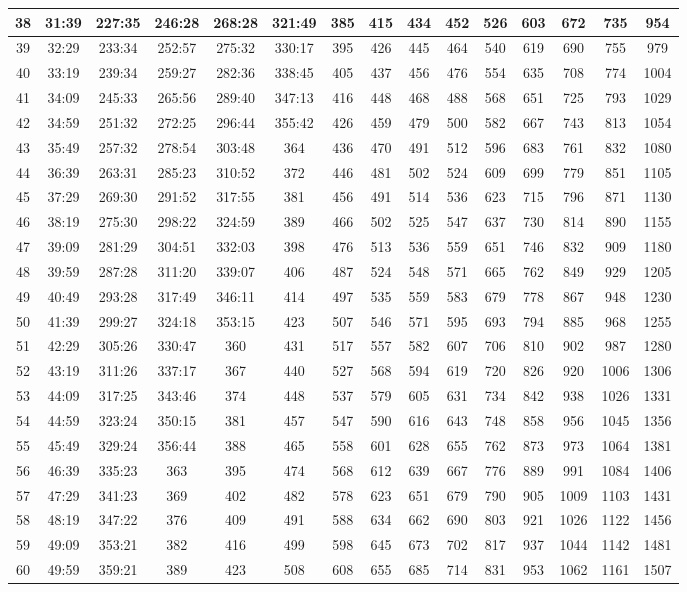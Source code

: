 \begin{footnotesize}
\begin{tabular}{c | c | c | c | c | c | c | c | c | c | c | c | c | c | c}
		38&31:39&227:35&246:28&268:28&321:49&385&415&434&452&526&603&672&735&954\\\hline
		39&32:29&233:34&252:57&275:32&330:17&395&426&445&464&540&619&690&755&979\\\hline
		40&33:19&239:34&259:27&282:36&338:45&405&437&456&476&554&635&708&774&1004\\\hline
		41&34:09&245:33&265:56&289:40&347:13&416&448&468&488&568&651&725&793&1029\\\hline
		42&34:59&251:32&272:25&296:44&355:42&426&459&479&500&582&667&743&813&1054\\\hline
		43&35:49&257:32&278:54&303:48&364&436&470&491&512&596&683&761&832&1080\\\hline
		44&36:39&263:31&285:23&310:52&372&446&481&502&524&609&699&779&851&1105\\\hline
		45&37:29&269:30&291:52&317:55&381&456&491&514&536&623&715&796&871&1130\\\hline
		46&38:19&275:30&298:22&324:59&389&466&502&525&547&637&730&814&890&1155\\\hline
		47&39:09&281:29&304:51&332:03&398&476&513&536&559&651&746&832&909&1180\\\hline
		48&39:59&287:28&311:20&339:07&406&487&524&548&571&665&762&849&929&1205\\\hline
		49&40:49&293:28&317:49&346:11&414&497&535&559&583&679&778&867&948&1230\\\hline
		50&41:39&299:27&324:18&353:15&423&507&546&571&595&693&794&885&968&1255\\\hline
		51&42:29&305:26&330:47&360&431&517&557&582&607&706&810&902&987&1280\\\hline
		52&43:19&311:26&337:17&367&440&527&568&594&619&720&826&920&1006&1306\\\hline
		53&44:09&317:25&343:46&374&448&537&579&605&631&734&842&938&1026&1331\\\hline
		54&44:59&323:24&350:15&381&457&547&590&616&643&748&858&956&1045&1356\\\hline
		55&45:49&329:24&356:44&388&465&558&601&628&655&762&873&973&1064&1381\\\hline
		56&46:39&335:23&363&395&474&568&612&639&667&776&889&991&1084&1406\\\hline
		57&47:29&341:23&369&402&482&578&623&651&679&790&905&1009&1103&1431\\\hline
		58&48:19&347:22&376&409&491&588&634&662&690&803&921&1026&1122&1456\\\hline
		59&49:09&353:21&382&416&499&598&645&673&702&817&937&1044&1142&1481\\\hline
		60&49:59&359:21&389&423&508&608&655&685&714&831&953&1062&1161&1507\\
\end{tabular}\end{footnotesize}

